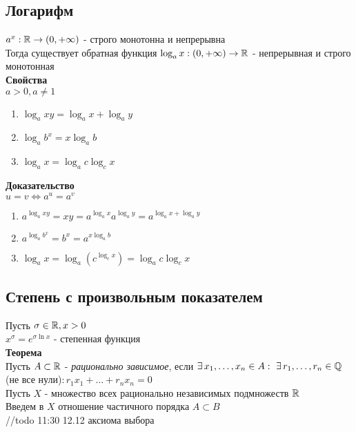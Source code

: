 \documentclass[12pt]{article}
\begin{document}
\subsection{Логарифм}
$a^x : \mathbb{R} \rightarrow (0, +\infty)$ - строго монотонна и непрерывна\\
Тогда существует обратная функция $\log_a x : (0, +\infty) \rightarrow \mathbb{R}$ - непрерывная и строго монотонная\\
\textbf{Свойства}\\
$a > 0, a \neq 1$
\begin{enumerate}
    \item $\log_a xy = \log_a x + \log_a y$    
    \item $\log_a b^x = x\log_a b$
    \item $\log_a x = \log_a c \log_c x$
\end{enumerate}
\textbf{Доказательство}\\
$u = v \Leftrightarrow a^u = a^v$
\begin{enumerate}
    \item $a^{\log_a xy} = xy = a^{\log_a x}a^{\log_a y} = a^{\log_a x + \log_a y}$
    \item $a^{\log_a b^x} = b^x = a^{x\log_a b}$
    \item $\log_a x = \log_a(c^{\log_c x}) = \log_a c \log_c x$
\end{enumerate}
\subsection{Степень с произвольным показателем}
Пусть $\sigma \in \mathbb{R}, x > 0$\\
$x^\sigma = e^{\sigma \ln x}$ - степенная функция\\
\textbf{Теорема}\\
Пусть $A \subset \mathbb{R}$ - \textit{рационально зависимое}, если $\exists\,x_1,\ldots,x_n \in A:\ \exists\, r_1, \ldots, r_n \in \mathbb{Q}$(не все нули)$: r_1x_1+\ldots+r_nx_n = 0$\\
Пусть $X$ - множество всех рационально независимых подмножеств $\mathbb{R}$\\
Введем в $X$ отношение частичного порядка $A \subset B$\\
//todo 11:30 12.12 аксиома выбора
\end{document}
